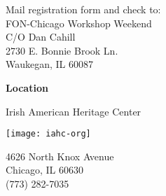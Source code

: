 \documentclass[12pt,
letterpaper]{leaflet}
\begin{document}
\pagebreak

\begin{landscape}

\hspace*{15em}
\begin{minipage}[t]{\textwidth}
\vspace{0pt}
Mail registration form and check to:\\

\vspace*{1.5em}
{\large
FON-Chicago Workshop Weekend\\
C/O Dan Cahill\\
2730 E. Bonnie Brook Ln.\\ Waukegan, IL 60087
}
\end{minipage}
\end{landscape}

\pagebreak

\begin{flushleft}
{\Large \textbf{Location}}

\vspace*{1.5em}
{\large {Irish American Heritage Center}}
\end{flushleft}

\vspace*{0.45em}
\begin{center}
\texttt{[image: iahc-org]}
\end{center}

4626 North Knox Avenue\\
Chicago, IL 60630\\
(773) 282-7035
\end{document}
